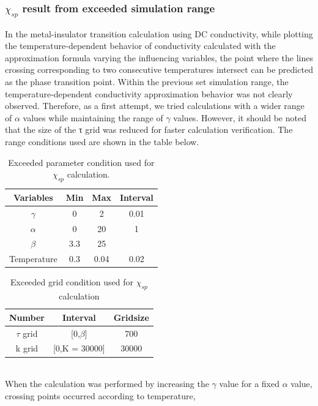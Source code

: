 \documentclass{article}[12pt]
\begin{document}
\begin{spacing}{1.5}
\subsubsection*{$\chi_{sp}$ result from exceeded simulation range}
In the metal-insulator transition calculation using DC conductivity, 
while plotting the temperature-dependent behavior of conductivity calculated with the approximation formula varying the influencing variables, 
the point where the lines crossing corresponding to two consecutive temperatures intersect can be predicted as the phase transition point.
Within the previous set simulation range, 
the temperature-dependent conductivity approximation behavior was not clearly observed. 
Therefore, as a first attempt, we tried calculations with a wider range of $\alpha$ values while maintaining the range of $\gamma$ values. 
However, it should be noted that the size of the τ grid was reduced for faster calculation verification. 
The range conditions used are shown in the table below.
\begin{table}[htbp]
  \centering
  \renewcommand{\arraystretch}{1.2}  %
  \begin{tabular}{@{}cccc@{}}
  \toprule
  \textbf{Variables} & \textbf{Min} & \textbf{Max}  & \textbf{Interval}\\ 
  \midrule
  $\gamma$ & 0 & 2 & 0.01 \\
  $\alpha$ & 0 & 20 & 1 \\
  $\beta$ & 3.3 & 25 &  \\
  Temperature & 0.3 & 0.04 & 0.02 \\
  \bottomrule
  \end{tabular}
  \caption{Exceeded parameter condition used for $\chi_{sp}$ calculation.}
  \end{table}
\begin{table}[htbp]
  \centering
  \renewcommand{\arraystretch}{1.2}  %
  \begin{tabular}{@{}ccc@{}}
  \toprule
  \textbf{Number} & \textbf{Interval} & \textbf{Gridsize}\\ 
  \midrule
  $\tau$ grid & [0,$\beta$] & 700 \\
  k grid & [0,K = 30000] & 30000 \\
  \bottomrule
  \end{tabular}
  \caption{Exceeded grid condition used for $\chi_{sp}$ calculation}
  \end{table}
\\
When the calculation was performed by increasing the $\gamma$ value for a fixed $\alpha$ value, crossing points occurred according to temperature, 

\end{spacing}
\end{document}

